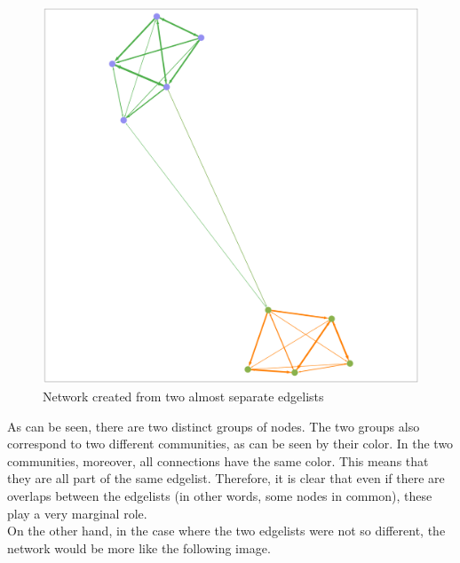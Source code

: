 \documentclass[a4paper,twoside,12pt, openany]{book}
\begin{document}
\begin{figure}[h!]
	\centering
	\includegraphics[scale=0.2]{dummy_graph.png}
	\caption{Network created from two almost separate edgelists}
	\label{fig:separate}
\end{figure}

As can be seen, there are two distinct groups of nodes. The two groups also correspond to two different communities, as can be seen by their color. In the two communities, moreover, all connections have the same color. This means that they are all part of the same edgelist. Therefore, it is clear that even if there are overlaps between the edgelists (in other words, some nodes in common), these play a very marginal role.\\
On the other hand, in the case where the two edgelists were not so different, the network would be more like the following image. 
\clearpage
\end{document}
